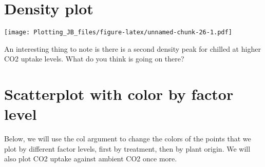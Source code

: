 \documentclass[]{article}
\newenvironment{Shaded}{\begin{snugshade}}{\end{snugshade}}
\newcommand{\DataTypeTok}[1]{\textcolor[rgb]{0.13,0.29,0.53}{#1}}
\newcommand{\DecValTok}[1]{\textcolor[rgb]{0.00,0.00,0.81}{#1}}
\newcommand{\KeywordTok}[1]{\textcolor[rgb]{0.13,0.29,0.53}{\textbf{#1}}}
\newcommand{\NormalTok}[1]{#1}
\newcommand{\OperatorTok}[1]{\textcolor[rgb]{0.81,0.36,0.00}{\textbf{#1}}}
\newcommand{\StringTok}[1]{\textcolor[rgb]{0.31,0.60,0.02}{#1}}
\begin{document}
\hypertarget{density-plot}{%
\section{Density plot}\label{density-plot}}

\begin{Shaded}
\end{Shaded}

\texttt{[image: Plotting\_JB\_files/figure-latex/unnamed-chunk-26-1.pdf]}

An interesting thing to note is there is a second density peak for
chilled at higher CO2 uptake levels. What do you think is going on
there?

\hypertarget{scatterplot-with-color-by-factor-level}{%
\section{Scatterplot with color by factor
level}\label{scatterplot-with-color-by-factor-level}}

Below, we will use the col argument to change the colors of the points
that we plot by different factor levels, first by treatment, then by
plant origin. We will also plot CO2 uptake against ambient CO2 once
more.
\end{document}
